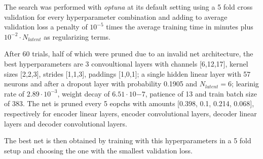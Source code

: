 \documentclass[a4paper, 11pt]{article}
\begin{document}
    The search was performed with \emph{optuna} at its default setting using a 5 fold cross validation for every hyperparameter combination and adding to average validation loss a penalty of $10^{-5}$ times the average training time in minutes plus $10^{-2} \cdot N_{latent}$ as regularizing terms.

    After 60 trials, half of which were pruned due to an invalid net architecture, the best hyperparameters are 3 convoultional layers with channels [6,12,17], kernel sizes [2,2,3], strides [1,1,3], paddings [1,0,1]; a single hidden linear layer with 57 neurons and after a dropout layer with probability 0.1905 and $N_{latent} = 6$; learinig rate of $2.89\cdot10^{-3}$, weight decay of $6.51\cdot10{-7}$, patience of 13 and train batch size of 383. The net is pruned every 5 eopchs with amounts [0.398, 0.1, 0.214, 0.068], respectively for encoder linear layers, encoder convolutional layers, decoder linear layers and decoder convolutional layers.

    The best net is then obtained by training with this hyperparameters in a 5 fold setup and choosing the one with the smallest validation loss.
\end{document}
